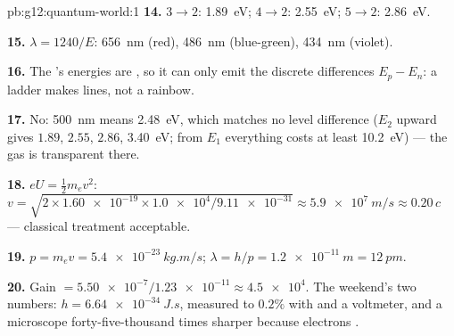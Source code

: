 \begin{solution}{pb:g12:quantum-world:1}
\textbf{14.} $3 \to 2$: \qty{1.89}{eV}; $4 \to 2$: \qty{2.55}{eV};
$5 \to 2$: \qty{2.86}{eV}.

\textbf{15.} $\lambda = 1240/E$: \qty{656}{nm} (red), \qty{486}{nm}
(blue-green), \qty{434}{nm} (violet).

\textbf{16.} The 's energies are , so it can only emit
the discrete differences $E_p - E_n$: a ladder makes lines, not a
rainbow.

\textbf{17.} No: \qty{500}{nm} means \qty{2.48}{eV}, which matches no
level difference ($E_2$ upward gives $1.89$, $2.55$, $2.86$,
\qty{3.40}{eV}; from $E_1$ everything costs at least \qty{10.2}{eV})
--- the gas is transparent there.

\textbf{18.} $eU = \tfrac12 m_e v^2$: $v = \sqrt{2 \times
\num{1.60e-19} \times \num{1.0e4}/\num{9.11e-31}} \approx
\qty{5.9e7}{m/s} \approx 0.20\,c$ --- classical treatment acceptable.

\textbf{19.} $p = m_e v = \qty{5.4e-23}{kg.m/s}$;
$\lambda = h/p = \qty{1.2e-11}{m} = \qty{12}{pm}$.

\textbf{20.} Gain $= \num{5.50e-7}/\num{1.23e-11} \approx \num{4.5e4}$.
The weekend's two numbers: $h = \qty{6.64e-34}{J.s}$, measured to
$0.2\%$ with  and a voltmeter, and a microscope
forty-five-thousand times sharper because electrons .
\end{solution}

